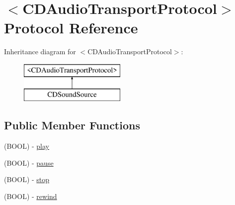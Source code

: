 \hypertarget{protocol_c_d_audio_transport_protocol-p}{\section{$<$C\-D\-Audio\-Transport\-Protocol$>$ Protocol Reference}
\label{protocol_c_d_audio_transport_protocol-p}
}
Inheritance diagram for $<$C\-D\-Audio\-Transport\-Protocol$>$\-:\begin{figure}[H]
\begin{center}
\leavevmode
\includegraphics[height=2.000000cm]{protocol_c_d_audio_transport_protocol-p}
\end{center}
\end{figure}
\subsection*{Public Member Functions}
\begin{DoxyCompactItemize}
\item 
(B\-O\-O\-L) -\/ \hyperlink{protocol_c_d_audio_transport_protocol-p_ae83f5577081a7533e7cf3750208aaa99}{play}
\item 
(B\-O\-O\-L) -\/ \hyperlink{protocol_c_d_audio_transport_protocol-p_a2e66ffe78d15d2d04f5bf56db52879cb}{pause}
\item 
(B\-O\-O\-L) -\/ \hyperlink{protocol_c_d_audio_transport_protocol-p_a6355710ae3c32cb8d624f5e33d98201d}{stop}
\item 
(B\-O\-O\-L) -\/ \hyperlink{protocol_c_d_audio_transport_protocol-p_aa25def4d8bcf4a802d299d234bcd9a50}{rewind}
\end{DoxyCompactItemize}


